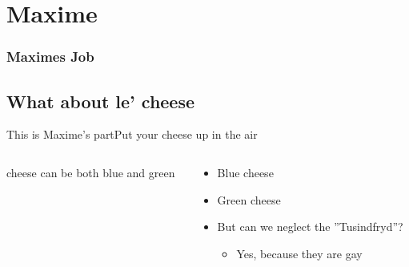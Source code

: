 \section{Maxime}
\begin{frame}
	\frametitle{Maximes Job}
	\tableofcontents[currentsection]
\end{frame}
\subsection{What about le' cheese}
\begin{frame}{This is Maxime's part}{Put your cheese up in the air}		
	\begin{columns}
		\begin{column}{0.5\textwidth}
		cheese can be both blue and green	
		\end{column}
		\begin{column}{0.5\textwidth} 
		\begin{itemize}
			\item<1-> Blue cheese
			\item<2-> Green cheese
			\item<3-> But can we neglect the ''Tusindfryd''?
			\begin{itemize}
				\item<4-> Yes, because they are gay
			\end{itemize}			
		\end{itemize}		
		\end{column}
	\end{columns}
\end{frame}